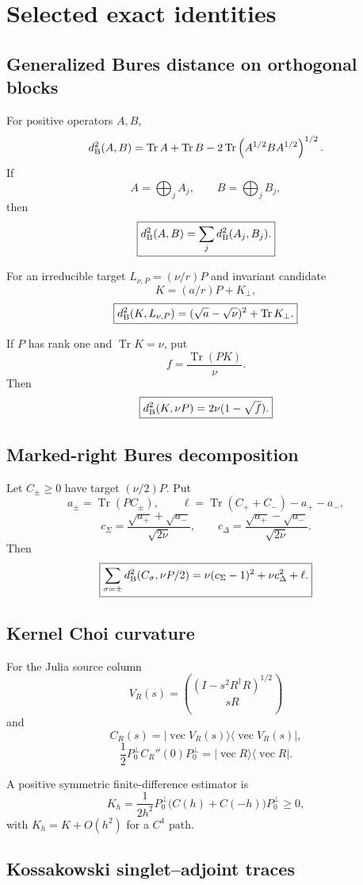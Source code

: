 \documentclass[11pt,oneside,openany]{book}
\numberwithin{equation}{chapter}
\theoremstyle{definition}
\theoremstyle{remark}
\newcommand{\Tr}{\operatorname{Tr}}
\newcommand{\vect}{\operatorname{vec}}
\begin{document}
\chapter{Selected exact identities}
\label{app:identities}

\section{Generalized Bures distance on orthogonal blocks}

For positive operators \(A,B\),
\[
 d_{\rm B}^2(A,B)
 =
 \Tr A+\Tr B
 -
 2\Tr\left(A^{1/2}BA^{1/2}\right)^{1/2}.
\]
If
\[
 A=\bigoplus_jA_j,
 \qquad
 B=\bigoplus_jB_j,
\]
then
\[
 \boxed{
 d_{\rm B}^2(A,B)
 =
 \sum_jd_{\rm B}^2(A_j,B_j).}
\]

For an irreducible target \(L_{\nu,P}=(\nu/r)P\) and invariant candidate
\[
 K=(a/r)P+K_\perp,
\]
\[
 \boxed{
 d_{\rm B}^2(K,L_{\nu,P})
 =
 (\sqrt a-\sqrt\nu)^2+\Tr K_\perp.}
\]

If \(P\) has rank one and \(\Tr K=\nu\), put
\[
 f=\frac{\Tr(PK)}{\nu}.
\]
Then
\[
 \boxed{
 d_{\rm B}^2(K,\nu P)
 =
 2\nu(1-\sqrt f).}
\]

\section{Marked-right Bures decomposition}

Let \(C_\pm\ge0\) have target \((\nu/2)P\).  Put
\[
 a_\pm=\Tr(PC_\pm),
 \qquad
 \ell=\Tr(C_++C_-)-a_+-a_-,
\]
\[
 c_\Sigma
 =
 \frac{\sqrt{a_+}+\sqrt{a_-}}{\sqrt{2\nu}},
 \qquad
 c_\Delta
 =
 \frac{\sqrt{a_+}-\sqrt{a_-}}{\sqrt{2\nu}}.
\]
Then
\[
 \boxed{
 \sum_{\sigma=\pm}
 d_{\rm B}^2(C_\sigma,\nu P/2)
 =
 \nu(c_\Sigma-1)^2+\nu c_\Delta^2+\ell.}
\]

\section{Kernel Choi curvature}

For the Julia source column
\[
 V_R(s)
 =
 \binom{(I-s^2R^\dagger R)^{1/2}}{sR}
\]
and
\[
 C_R(s)=|\vect V_R(s)\rangle\langle\vect V_R(s)|,
\]
\[
 \boxed{
 \frac12P_0^\perp C_R''(0)P_0^\perp
 =
 |\vect R\rangle\langle\vect R|.}
\]

A positive symmetric finite-difference estimator is
\[
 \boxed{
 K_h
 =
 \frac1{2h^2}
 P_0^\perp\bigl(C(h)+C(-h)\bigr)P_0^\perp
 \ge0,}
\]
with \(K_h=K+O(h^2)\) for a \(C^4\) path.

\section{Kossakowski singlet--adjoint traces}
\end{document}
